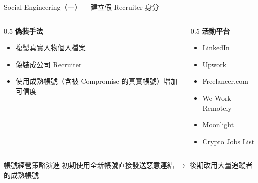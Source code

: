 \documentclass{beamer}
\begin{document}
\begin{frame}{Social Engineering（一）— 建立假 Recruiter 身分}
  \begin{columns}[T]
    \begin{column}{0.5\textwidth}
      \textbf{偽裝手法}
      \begin{itemize}
        \item 複製真實人物個人檔案
        \item 偽裝成公司 Recruiter
        \item 使用成熟帳號（含被 Compromise 的真實帳號）增加可信度
      \end{itemize}
    \end{column}
    \begin{column}{0.5\textwidth}
      \textbf{活動平台}
      \begin{itemize}
        \item LinkedIn
        \item Upwork
        \item Freelancer.com
        \item We Work Remotely
        \item Moonlight
        \item Crypto Jobs List
      \end{itemize}
    \end{column}
  \end{columns}
  \vspace{0.5cm}
  \begin{alertblock}{帳號經營策略演進}
    初期使用全新帳號直接發送惡意連結 $\rightarrow$ 後期改用大量追蹤者的成熟帳號
  \end{alertblock}
\end{frame}
\end{document}
